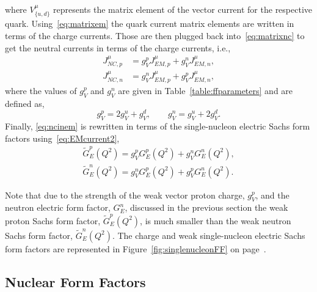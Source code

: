 where $V_{\lbrace u,d \rbrace}^{\mu}$ represents the matrix element of the vector current for the respective quark. Using~\eqref{eq:matrixem} the quark current matrix elements  are written in terms of the charge currents. Those are then plugged back into~\eqref{eq:matrixnc} to get the neutral currents in terms of the charge currents, i.e.,
\begin{equation}\label{eq:ncinem}
\begin{aligned}
J^{\mu}_{NC,p} &= g_V^p J^{\mu}_{EM,p} + g_V^n J^{\mu}_{EM,n},
\\
J^{\mu}_{NC,n} &= g_V^n J^{\mu}_{EM,p}+  g_V^p J^{\mu}_{EM,n},
\end{aligned}
\end{equation}
where the values of $g_V^p$ and $g_V^n$ are given in Table~\ref{table:ffparameters} and  are defined as,
\begin{equation}
g_V^p = 2g_V^u+g_V^d,\qquad g_V^n = g_V^u + 2g_V^d.
\end{equation}
Finally, \eqref{eq:ncinem} is rewritten in terms of the single-nucleon electric Sachs form factors using~\eqref{eq:EMcurrent2},
\begin{equation}\label{eq:ncsingleff}
\begin{aligned}
\widetilde{G}_E^p(Q^2)= g_V^p G_E^p(Q^2) + g_V^n G_E^n(Q^2),
\\
\widetilde{G}_E^n(Q^2)= g_V^n G_E^p(Q^2) + g_V^p G_E^n(Q^2).
\end{aligned}
\end{equation}

Note that due to the strength of the weak vector proton charge, $g_V^p$, and the neutron electric form factor, $G_E^n$, discussed in the previous section the weak proton Sachs form factor, $\widetilde{G}_E^p(Q^2)$, is much smaller than the weak neutron Sachs form factor, $\widetilde{G}_E^n(Q^2)$. The charge and weak single-nucleon electric Sachs form factors are represented in Figure~\ref{fig:singlenucleonFF} on page~\pageref{fig:singlenucleonFF}.

\subsection{Nuclear Form Factors}
\label{sec:nuclearff}

